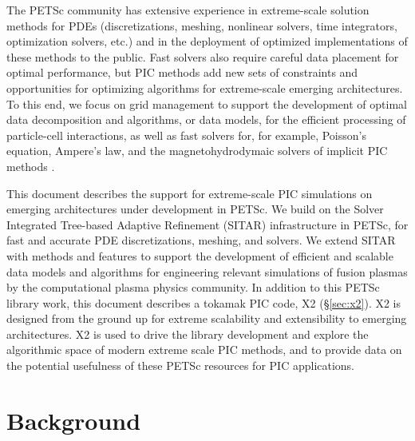 \documentclass[review]{siamart}
\begin{document}
The PETSc community has extensive experience in extreme-scale solution methods for PDEs (discretizations, meshing,  nonlinear solvers, time integrators, optimization solvers, etc.) and in the deployment of optimized implementations of these methods to the public.
Fast solvers also require careful data placement for optimal performance, but PIC methods add new sets of constraints and opportunities for optimizing algorithms for extreme-scale emerging architectures.
To this end, we focus on grid management to support the development of optimal data decomposition and algorithms, or data models,  for the efficient processing of particle-cell interactions, as well as fast solvers for, for example, Poisson's equation, Ampere's law, and the magnetohydrodymaic  solvers of implicit PIC methods \cite{DBLP:journals/cphysics/ChenC15,Adams-10a}.

This document describes the support for extreme-scale PIC simulations on emerging architectures under development in PETSc.
We build on the Solver Integrated Tree-based Adaptive Refinement (SITAR) infrastructure in PETSc, for fast and accurate PDE discretizations, meshing, and solvers.
We extend SITAR with methods and features to support the development of efficient and scalable data models and algorithms for engineering relevant simulations of fusion plasmas by the computational plasma physics community.
In addition to this PETSc library work, this document describes a tokamak PIC code, X2 (\S\ref{sec:x2}).
X2 is designed from the ground up for extreme scalability and extensibility to emerging architectures.
X2 is used to drive the library development and explore the algorithmic space of modern extreme scale PIC methods, and to provide data on the potential usefulness of these PETSc resources for PIC applications.

\section{Background}
\end{document}
